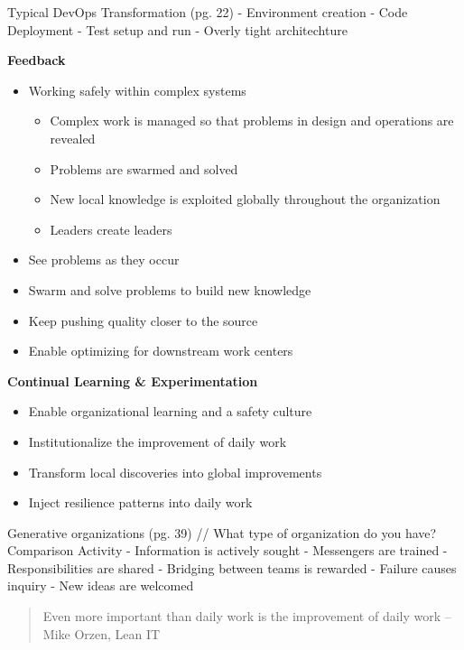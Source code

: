 \documentclass[]{book}
\providecommand{\tightlist}{%
  \setlength{\itemsep}{0pt}\setlength{\parskip}{0pt}}
\theoremstyle{definition}
\theoremstyle{definition}
\theoremstyle{definition}
\theoremstyle{remark}
\begin{document}
Typical DevOps Transformation (pg. 22) - Environment creation - Code
Deployment - Test setup and run - Overly tight architechture

\textbf{Feedback}

\begin{itemize}
\tightlist
\item
  Working safely within complex systems

  \begin{itemize}
  \tightlist
  \item
    Complex work is managed so that problems in design and operations
    are revealed
  \item
    Problems are swarmed and solved
  \item
    New local knowledge is exploited globally throughout the
    organization
  \item
    Leaders create leaders
  \end{itemize}
\item
  See problems as they occur
\item
  Swarm and solve problems to build new knowledge
\item
  Keep pushing quality closer to the source
\item
  Enable optimizing for downstream work centers
\end{itemize}

\textbf{Continual Learning \& Experimentation}

\begin{itemize}
\tightlist
\item
  Enable organizational learning and a safety culture
\item
  Institutionalize the improvement of daily work
\item
  Transform local discoveries into global improvements
\item
  Inject resilience patterns into daily work
\end{itemize}

Generative organizations (pg. 39) // What type of organization do you
have? Comparison Activity - Information is actively sought - Messengers
are trained - Responsibilities are shared - Bridging between teams is
rewarded - Failure causes inquiry - New ideas are welcomed

\begin{quote}
Even more important than daily work is the improvement of daily work
--Mike Orzen, Lean IT
\end{quote}
\end{document}
